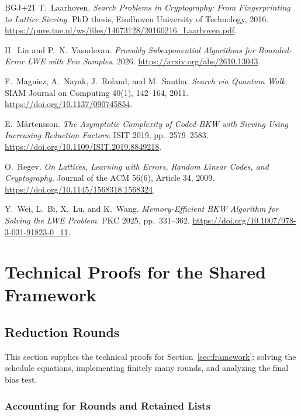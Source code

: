 \documentclass[runningheads,envcountsame,envcountsect,orivec]{llncs}
\begin{document}
\begin{thebibliography}{BGJ+21}
T.~Laarhoven.
\emph{Search Problems in Cryptography: From Fingerprinting to Lattice Sieving}.
PhD thesis, Eindhoven University of Technology, 2016.
\url{https://pure.tue.nl/ws/files/14673128/20160216_Laarhoven.pdf}.

H.~Lin and P.~N.~Vasudevan.
\emph{Provably Subexponential Algorithms for Bounded-Error LWE with Few Samples}.
2026. \url{https://arxiv.org/abs/2610.13043}.

F.~Magniez, A.~Nayak, J.~Roland, and M.~Santha.
\emph{Search via Quantum Walk}.
SIAM Journal on Computing 40(1), 142--164, 2011.
\url{https://doi.org/10.1137/090745854}.

E.~M{\aa}rtensson.
\emph{The Asymptotic Complexity of Coded-BKW with Sieving Using Increasing Reduction Factors}.
ISIT 2019, pp.~2579--2583.
\url{https://doi.org/10.1109/ISIT.2019.8849218}.

O.~Regev.
\emph{On Lattices, Learning with Errors, Random Linear Codes, and Cryptography}.
Journal of the ACM 56(6), Article 34, 2009.
\url{https://doi.org/10.1145/1568318.1568324}.

Y.~Wei, L.~Bi, X.~Lu, and K.~Wang.
\emph{Memory-Efficient BKW Algorithm for Solving the LWE Problem}.
PKC 2025, pp.~331--362.
\url{https://doi.org/10.1007/978-3-031-91823-0_11}.

\end{thebibliography}

\clearpage
\appendix
\renewcommand{\theHsection}{appendix.\Alph{section}}
\renewcommand{\theHsubsection}{\theHsection.\arabic{subsection}}
\renewcommand{\theHsubsubsection}{\theHsubsection.\arabic{subsubsection}}
\section{Technical Proofs for the Shared Framework}
\label{app:shared-proofs}

\subsection{Reduction Rounds}
\label{app:schedule-details}

This section supplies the technical proofs for Section~\ref{sec:framework}:
solving the schedule equations, implementing finitely many rounds,
and analyzing the final bias test.

\subsubsection{Accounting for Rounds and Retained Lists}
\label{app:shared-moment-proof}
\end{document}
